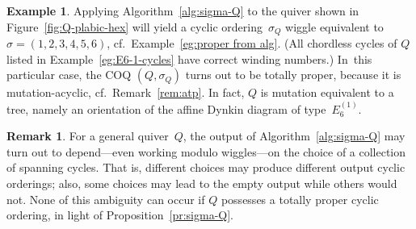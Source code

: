\documentclass[11pt, letterpaper]{amsart}
\newcommand{\hide}[1]{}
\theoremstyle{definition}
\newtheorem{remark}[theorem]{Remark}
\newtheorem{example}[theorem]{Example}
\numberwithin{equation}{section}
\begin{document}
\begin{example}
Applying Algorithm~\ref{alg:sigma-Q} to the quiver shown in Figure~\ref{fig:Q-plabic-hex}
will yield a cyclic ordering~$\sigma_Q$ wiggle equivalent to $\sigma=(1, 2, 3, 4, 5, 6)$, cf.\ Example~\ref{eg:proper from alg}. 
(All chordless cycles of $Q$ listed in Example~\ref{eg:E6-1-cycles} have correct winding numbers.)
In~this particular case, the COQ $(Q,\sigma_Q)$ turns out to be totally proper,
because it is mutation-acyclic, cf.\ Remark~\ref{rem:atp}. 
In fact, $Q$ is mutation equivalent to a tree, namely an orientation of the affine Dynkin diagram of type~$E_6^{(1)}$. 
\end{example}

\begin{remark}
\label{rem:ambiguous-sigma-Q}
For a general quiver~$Q$, the output of Algorithm~\ref{alg:sigma-Q} may turn out to depend---even working 
modulo wiggles---on the choice of a collection of spanning cycles.
That is, different choices may produce different output cyclic orderings;
also, some choices may lead to the empty output while others would not.
None of this ambiguity can occur if $Q$ possesses a totally proper cyclic ordering,
in light of Proposition~\ref{pr:sigma-Q}. 
\end{remark}

\hide{
In general there may be exponentially many chordless cycles. %
When there are not so many, they may be enumerated fairly quickly. %
}
\end{document}
